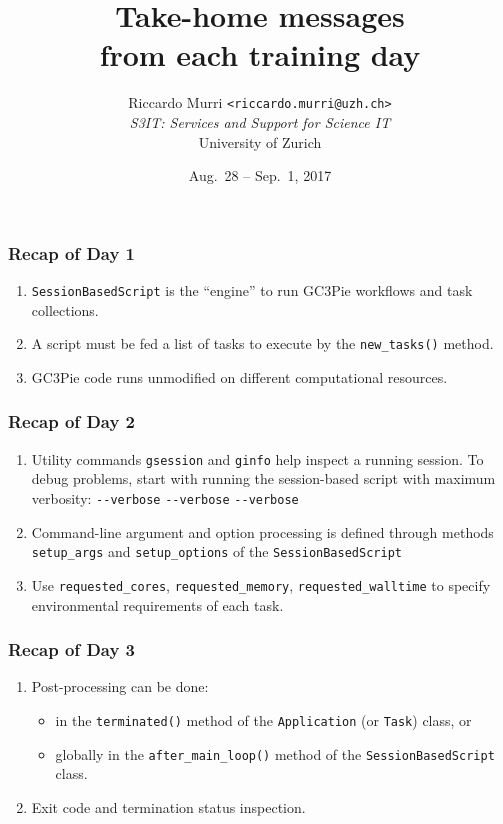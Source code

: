 \documentclass[english,serif,mathserif,xcolor=pdftex,dvipsnames,table]{beamer}
\title[Recap]{%
  Take-home messages \\ from each training day
}
\author[R. Murri, S3IT UZH]{%
  Riccardo Murri \texttt{<riccardo.murri@uzh.ch>}
  \\[1ex]
  \emph{S3IT: Services and Support for Science IT}
  \\[1ex]
  University of Zurich
}
\date{Aug.~28 -- Sep.~1, 2017}
\begin{document}
\maketitle


\begin{frame}[fragile]
  \frametitle{Recap of Day 1}

  \begin{enumerate}
  \item \texttt{SessionBasedScript} is the ``engine'' to run GC3Pie workflows and task collections.

  \+\item A script must be fed a list of tasks to execute by the \lstinline|new_tasks()| method.

  \+\item GC3Pie code runs unmodified on different computational resources.
  \end{enumerate}
\end{frame}


\begin{frame}[fragile]
  \frametitle{Recap of Day 2}

  \begin{enumerate}
  \item Utility commands \texttt{gsession} and \texttt{ginfo} help
    inspect a running session.  To debug problems, start with running
    the session-based script with maximum verbosity:
    \texttt{-{}-verbose} \texttt{-{}-verbose} \texttt{-{}-verbose}

    \+\item Command-line argument and option processing is defined through
    methods \lstinline|setup_args| and \lstinline|setup_options| of the
    \texttt{SessionBasedScript}

    \+\item Use \lstinline|requested_cores|,
    \lstinline|requested_memory|, \lstinline|requested_walltime| to
    specify environmental requirements of each task.
  \end{enumerate}
\end{frame}


\begin{frame}
  \frametitle{Recap of Day 3}

  \begin{enumerate}
  \item Post-processing can be done:
    \begin{itemize}
    \item in the \texttt{terminated()} method of the \texttt{Application} (or \texttt{Task}) class, or
    \item globally in the \lstinline|after_main_loop()| method of the \texttt{SessionBasedScript} class.
    \end{itemize}
  \item Exit code and termination status inspection.
  \end{enumerate}
\end{frame}
\end{document}
